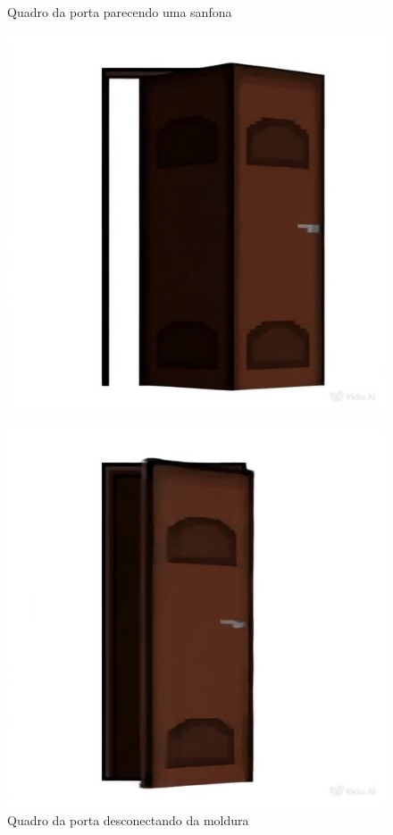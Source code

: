 \begin{figure}[htbp]
    \centering
    \begin{minipage}{0.32\textwidth}
    \centering
    \caption{\small Quadro da porta parecendo uma sanfona}
    \includegraphics[width=1\linewidth]{figs/vidu/framePortaSanfona.jpg}
    \label{fig:viduPortaSanfona}
    \end{minipage}\hfill
    \begin{minipage}{0.32\textwidth}
    \centering
    \caption{\small Quadro da porta desconectando da moldura}    \includegraphics[width=1\linewidth]{figs/vidu/framePortaDesconexao.jpg}

\end{minipage}
\end{figure}
